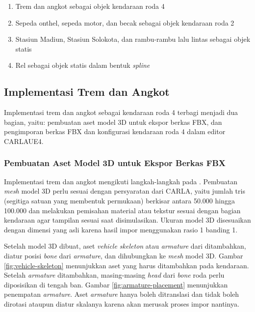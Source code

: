 \begin{enumerate}
    \item Trem dan angkot sebagai objek kendaraan roda 4
    \item Sepeda onthel, sepeda motor, dan becak sebagai objek kendaraan roda 2
    \item Stasiun Madiun, Stasiun Solokota, dan rambu-rambu lalu lintas sebagai
    objek statis
    \item Rel sebagai objek statis dalam bentuk \textit{spline}
\end{enumerate}


\subsection{Implementasi Trem dan Angkot}

Implementasi trem dan angkot sebagai kendaraan roda 4 terbagi menjadi dua
bagian, yaitu: pembuatan aset model 3D untuk ekspor berkas FBX, dan
pengimporan berkas FBX dan konfigurasi kendaraan roda 4 dalam editor CARLAUE4.

\subsubsection{Pembuatan Aset Model 3D untuk Ekspor Berkas FBX}

Implementasi trem dan angkot mengikuti langkah-langkah pada
\textcite{carla-documentation}. Pembuatan \textit{mesh} model 3D perlu sesuai
dengan persyaratan dari CARLA, yaitu jumlah tris (segitiga satuan yang membentuk
permukaan) berkisar antara 50.000 hingga 100.000 dan melakukan pemisahan
material atau tekstur sesuai dengan bagian kendaraan agar tampilan sesuai saat
disimulasikan. Ukuran model 3D disesuaikan dengan dimensi yang asli karena hasil
impor menggunakan rasio 1 banding 1.

Setelah model 3D dibuat, aset \textit{vehicle skeleton} atau \textit{armature}
dari \textcite{carla-documentation} ditambahkan, diatur posisi \textit{bone}
dari \textit{armature}, dan dihubungkan ke \textit{mesh} model 3D. Gambar
\ref{fig:vehicle-skeleton} menunjukkan aset yang harus ditambahkan pada
kendaraan. Setelah \textit{armature} ditambahkan, masing-masing \textit{head}
dari \textit{bone} roda perlu diposisikan di tengah ban. Gambar
\ref{fig:armature-placement} menunjukkan penempatan \textit{armature}. Aset
\textit{armature} hanya boleh ditranslasi dan tidak boleh dirotasi ataupun
diatur skalanya karena akan merusak proses impor nantinya.

